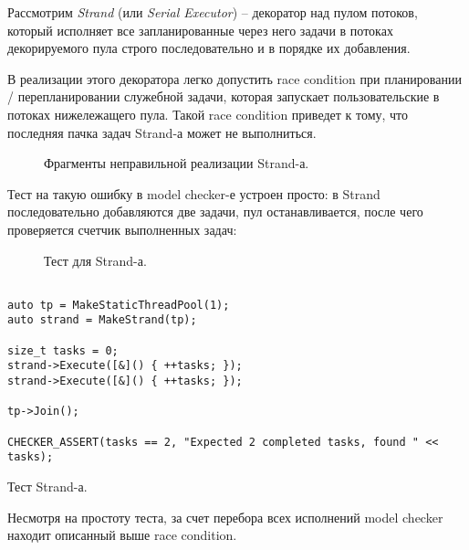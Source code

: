 \fi

Рассмотрим \emph{Strand} (или \emph{Serial Executor}) – декоратор над пулом потоков, который исполняет все запланированные через него задачи в потоках декорируемого пула строго последовательно и в порядке их добавления.

В реализации этого декоратора легко допустить race condition при планировании / перепланировании служебной задачи, которая запускает пользовательские в потоках нижележащего пула. Такой race condition приведет к тому, что последняя пачка задач Strand-а может не выполниться.

\begin{figure}
	\bigskip
	\caption{Фрагменты неправильной реализации Strand-а.}
\end{figure}

Тест на такую ошибку в model checker-е устроен просто: в Strand последовательно добавляются две задачи, пул останавливается, после чего проверяется счетчик выполненных задач:


\begin{figure}
	\bigskip
	\caption{Тест для Strand-а.}\label{fig:strandtest}
\end{figure}

\else

\begin{listing}
	\centering
	
	\begin{verbatim}
    
auto tp = MakeStaticThreadPool(1);
auto strand = MakeStrand(tp);

size_t tasks = 0;
strand->Execute([&]() { ++tasks; });
strand->Execute([&]() { ++tasks; });

tp->Join();

CHECKER_ASSERT(tasks == 2, "Expected 2 completed tasks, found " << tasks);

	\end{verbatim}
	\caption{Тест Strand-а.}
	\label{strandtest}
\end{listing}

\fi

Несмотря на простоту теста, за счет перебора всех исполнений model checker находит описанный выше race condition.
